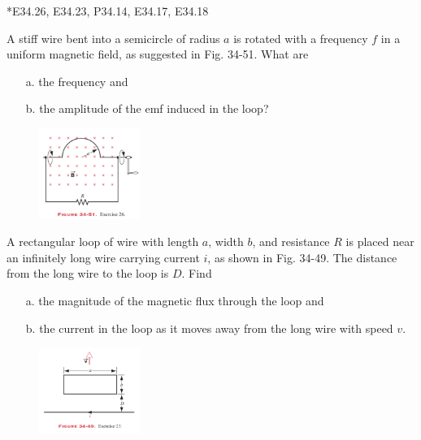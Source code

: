 \documentclass[11pt,letterpaper,boxed]{pset}
\begin{document}
    \begin{center}
        *E34.26, E34.23, P34.14, E34.17, E34.18
    \end{center}
    
    \begin{problem} [*E34.26]
        A stiff wire bent into a semicircle of radius $a$ is rotated with a frequency $f$ in a uniform magnetic field, as suggested in Fig. 34-51. What are
        \begin{enumerate}
            \item [a.] the frequency and
            \item [b.] the amplitude of the emf induced in the loop?
        \end{enumerate}
    \end{problem}
    
    \begin{figure} [ht]
        \includegraphics[width=125px]{HW8Images/E34-26.png}
        \label{fig:E34-26}
    \end{figure}
    \newpage
    
    \begin{problem} [E34.23]
        A rectangular loop of wire with length $a$, width $b$, and resistance $R$ is placed near an infinitely long wire carrying current $i$, as shown in Fig. 34-49. The distance from the long wire to the loop is $D$. Find
        
        \begin{enumerate}
            \item [a.] the magnitude of the magnetic flux through the loop and
            \item [b.] the current in the loop as it moves away from the long wire with speed $v$.
        \end{enumerate}
    \end{problem}
    
    \begin{figure} [ht]
        \includegraphics[width=125px]{HW8Images/E34-23.png}
        \label{fig:E34-23}
    \end{figure}
    \newpage
    
\end{document}
